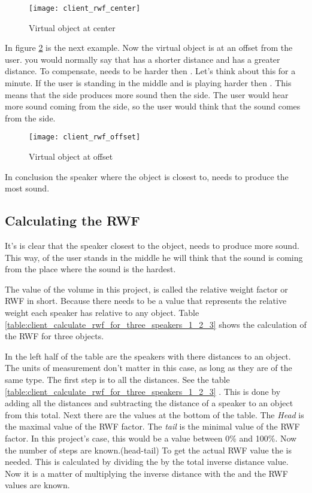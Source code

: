 {\begin{figure}[H]
    \centering
    \texttt{[image: client\_rwf\_center]}
    \caption{Virtual object at center}
    \label{fig:client_rwf_center}
\end{figure}

In figure \ref{fig:client_rwf_offset} is the next example. Now the virtual object is at an offset from the user.
you would normally say that  has a shorter distance and  has a greater distance.
To compensate,  needs to be harder then . Let's think about this for a minute.
If the user is standing in the middle and  is playing harder then .
This means that the  side produces more sound then the  side.
The user would hear more sound coming from the  side, so the user would think that the sound comes from the  side.

\begin{figure}[H]
    \centering
    \texttt{[image: client\_rwf\_offset]}
    \caption{Virtual object at offset}
    \label{fig:client_rwf_offset}
\end{figure}

In conclusion the speaker where the object is closest to, needs to produce the most sound.

\subsection{Calculating the RWF}
\label{sub:client_calculating_the_rwf}
It's is clear that the speaker closest to the object, needs to produce more sound.
This way, of the user stands in the middle he will think that the sound is coming from the place where the sound is the hardest.

The value of the volume in this project, is called the relative weight factor or RWF in short.
Because there needs to be a value that represents the relative weight each speaker has relative to any object.
Table \ref{table:client_calculate_rwf_for_three_speakers_1_2_3} shows the calculation of the RWF for three objects.


In the left half of the table are the speakers with there distances to an object.
The units of measurement don't matter in this case, as long as they are of the same type.
The first step is to  all the distances. See the table \ref{table:client_calculate_rwf_for_three_speakers_1_2_3} .
This is done by adding all the distances and subtracting the distance of a speaker to an object from this total.
Next there are the values at the bottom of the table. The \textit{Head} is the maximal value of the RWF factor.
The \textit{tail} is the minimal value of the RWF factor. In this project's case, this would be a value between 0\% and 100\%.
Now the number of steps are known.(head-tail)
To get the actual RWF value the  is needed. This is calculated by dividing the  by the total inverse distance value.
Now it is a matter of multiplying the inverse distance with the  and the RWF values are known.

}
